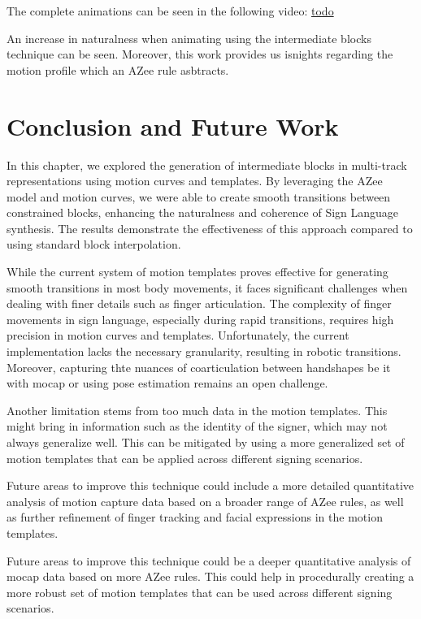 \documentclass[../../main.tex]{subfiles}
\begin{document}
The complete animations can be seen in the following video: \url{todo}

An increase in naturalness when animating using the intermediate blocks technique can be seen. Moreover, this work provides us isnights regarding the motion profile which an AZee rule asbtracts.

\section{Conclusion and Future Work}
\label{ch:intermediate_blocks:conclusion_and_future_work}

In this chapter, we explored the generation of intermediate blocks in multi-track representations using motion curves and templates. By leveraging the AZee model and motion curves, we were able to create smooth transitions between constrained blocks, enhancing the naturalness and coherence of Sign Language synthesis. The results demonstrate the effectiveness of this approach compared to using standard block interpolation. 

While the current system of motion templates proves effective for generating smooth transitions in most body movements, it faces significant challenges when dealing with finer details such as finger articulation. The complexity of finger movements in sign language, especially during rapid transitions, requires high precision in motion curves and templates. Unfortunately, the current implementation lacks the necessary granularity, resulting in robotic transitions. Moreover, capturing thte nuances of coarticulation between handshapes be it with mocap or using pose estimation remains an open challenge.

Another limitation stems from too much data in the motion templates. This might bring in information such as the identity of the signer, which may not always generalize well. This can be mitigated by using a more generalized set of motion templates that can be applied across different signing scenarios.

Future areas to improve this technique could include a more detailed quantitative analysis of motion capture data based on a broader range of AZee rules, as well as further refinement of finger tracking and facial expressions in the motion templates.

Future areas to improve this technique could be a deeper quantitative analysis of mocap data based on more AZee rules. This could help in procedurally creating a more robust set of motion templates that can be used across different signing scenarios.
\end{document}
